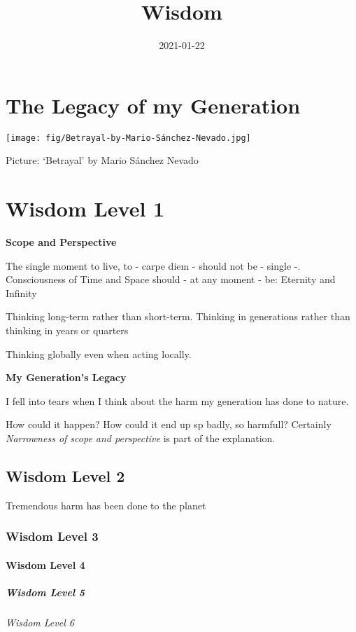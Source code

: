\documentclass[
]{book}
\title{Wisdom}
\author{}
\date{\vspace{-2.5em}2021-01-22}
\begin{document}
\maketitle

{
\setcounter{tocdepth}{1}
\tableofcontents
}
\hypertarget{the-legacy-of-my-generation}{%
\chapter{The Legacy of my Generation}\label{the-legacy-of-my-generation}}

\texttt{[image: fig/Betrayal-by-Mario-Sánchez-Nevado.jpg]}

Picture: `Betrayal' by Mario Sánchez Nevado

\hypertarget{wisdom-level-1}{%
\chapter{Wisdom Level 1}\label{wisdom-level-1}}

\textbf{Scope and Perspective}

The single moment to live, to - carpe diem - should not be - single -.
Consciousness of Time and Space should - at any moment - be: Eternity and Infinity

Thinking long-term rather than short-term.
Thinking in generations rather than thinking in years or quarters

Thinking globally even when acting locally.

\textbf{My Generation's Legacy}

I fell into tears when I think about the harm my generation has done to nature.

How could it happen? How could it end up sp badly, so harmfull?
Certainly \emph{Narrowness of scope and perspective} is part of the explanation.

\hypertarget{wisdom-level-2}{%
\section{Wisdom Level 2}\label{wisdom-level-2}}

Tremendous harm has been done to the planet

\hypertarget{wisdom-level-3}{%
\subsection{Wisdom Level 3}\label{wisdom-level-3}}

\hypertarget{wisdom-level-4}{%
\subsubsection{Wisdom Level 4}\label{wisdom-level-4}}

\hypertarget{wisdom-level-5}{%
\paragraph{Wisdom Level 5}\label{wisdom-level-5}}

\hypertarget{wisdom-level-6}{%
\subparagraph{Wisdom Level 6}\label{wisdom-level-6}}

  
\end{document}
